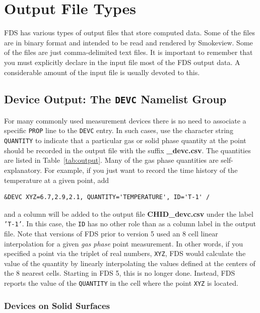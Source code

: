 \documentclass[11pt]{book}
\newcommand{\ct}{\tt\small}
\begin{document}
\clearpage

\section{Output File Types}

FDS has various types of output files that store computed data. Some of the files are in binary format and intended to be read and
rendered by Smokeview. Some of the files are just comma-delimited text files. It is important to remember that you must explicitly declare in
the input file most of the FDS output data. A considerable amount of the input file is usually devoted to this.


\subsection{Device Output: The \texorpdfstring{{\tt DEVC}}{DEVC} Namelist Group}


For many commonly used measurement devices there is no need to associate a
specific {\ct PROP} line to the {\ct DEVC} entry. In such cases, use the character string
{\ct QUANTITY} to indicate that a particular gas or solid phase quantity at the point should be recorded in
the output file with the suffix {\bf \_devc.csv}. The quantities are listed in Table~\ref{tab:output}.
Many of the gas phase quantities are self-explanatory. For example, if you just want to record the time history of the temperature at a given point, add

\footnotesize
\begin{verbatim}
&DEVC XYZ=6.7,2.9,2.1, QUANTITY='TEMPERATURE', ID='T-1' /
\end{verbatim}
\normalsize

\noindent
and a column will be added to the output file {\bf CHID\_devc.csv} under the label {\ct 'T-1'}. In this case, the {\ct ID} has no other role than as a column label in the output file.
Note that versions of FDS prior to version 5 used an 8 cell linear interpolation for a given {\em gas phase} point measurement. In other words, if you
specified a point via the triplet of real numbers, {\ct XYZ}, FDS would calculate the value of the quantity by linearly interpolating the
values defined at the centers of the 8 nearest cells. Starting in FDS 5, this is no longer done. Instead, FDS reports the value of the {\ct QUANTITY} in
the cell where the point {\ct XYZ} is located.

\subsubsection{Devices on Solid Surfaces}
\end{document}
